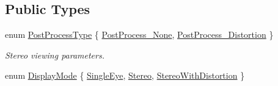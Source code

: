 \subsection*{Public Types}
\begin{DoxyCompactItemize}
\item 
enum \hyperlink{class_b_g_e_1_1_rift_controller_a87049aa35e2aff9e87fcdee351e3ff02}{Post\-Process\-Type} \{ \hyperlink{class_b_g_e_1_1_rift_controller_a87049aa35e2aff9e87fcdee351e3ff02a4242bc573f67bf00dea982a116356542}{Post\-Process\-\_\-\-None}, 
\hyperlink{class_b_g_e_1_1_rift_controller_a87049aa35e2aff9e87fcdee351e3ff02a762c3fa8ddce39e988074c97f6cc6fc5}{Post\-Process\-\_\-\-Distortion}
 \}
\begin{DoxyCompactList}\small\item\em Stereo viewing parameters. \end{DoxyCompactList}\item 
enum \hyperlink{class_b_g_e_1_1_rift_controller_aa838447581190009976c2fb8cde1735a}{Display\-Mode} \{ \hyperlink{class_b_g_e_1_1_rift_controller_aa838447581190009976c2fb8cde1735aa12c008414429cdcc37c2674b09604140}{Single\-Eye}, 
\hyperlink{class_b_g_e_1_1_rift_controller_aa838447581190009976c2fb8cde1735aa9de3fcf06e6957847f1820527e2d7504}{Stereo}, 
\hyperlink{class_b_g_e_1_1_rift_controller_aa838447581190009976c2fb8cde1735aa43950a7c2c00a71fe27c1be46a2bcced}{Stereo\-With\-Distortion}
 \}
\end{DoxyCompactItemize}
